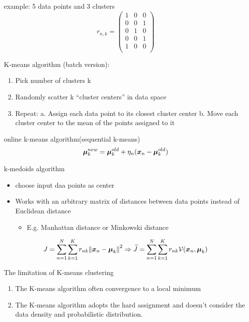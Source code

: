 \documentclass[11pt]{article}
\begin{document}
example: 5 data points and 3 clusters
\[
r_{n,k}=\begin{pmatrix}
 1 & 0 & 0 \\
 0 & 0 & 1 \\
 0 & 1 & 0 \\
 0 & 0 & 1 \\
 1 & 0 & 0 \\
\end{pmatrix}
\]

K-means algorithm (batch version):
\begin{enumerate}
\item Pick number of clusters k
\item Randomly scatter k “cluster centers” in data space
\item Repeat:
a. Assign each data point to its closest cluster center
b. Move each cluster center to the mean of the points assigned to it
\end{enumerate}


online k-means algorithm(sequential k-means)
\begin{equation*}
\boldsymbol{\mu}_k^{new}=\boldsymbol{\mu}_k^{old}+\eta_n(\boldsymbol{x}_n-\boldsymbol{\mu}_k^{old})
\end{equation*}


k-medoids algorithm
\begin{itemize}
\item choose input daa points as center
\item Works with an arbitrary matrix of distances between data points instead of
Euclidean distance 
\begin{itemize}
\item E.g. Manhattan distance or Minkowski distance
\end{itemize}
\end{itemize}


\begin{equation*}
J=\displaystyle\sum_{n=1}^N \displaystyle\sum_{k=1}^Kr_{nk}
\norm{\boldsymbol{x}_n-\boldsymbol{\mu}_k}^2\Rightarrow
\widetilde{J}=\displaystyle\sum_{n=1}^N \displaystyle\sum_{k=1}^Kr_{nk}
\mathcal{V}(\boldsymbol{x}_n,\boldsymbol{\mu}_k)
\end{equation*}


The limitation of K-means clustering
\begin{enumerate}
\item The K-means algorithm often convergence to a local minimum
\item The K-means algorithm adopts the hard assignment and doesn’t consider the
data density and probabilistic distribution.
\end{enumerate}
\end{document}
